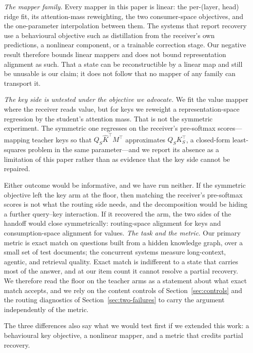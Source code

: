 \documentclass[11pt]{article}
\begin{document}
\emph{The mapper family.}
Every mapper in this paper is linear: the per-(layer, head) ridge fit, its
attention-mass reweighting, the two consumer-space objectives, and the
one-parameter interpolation between them.
The systems that report recovery use a behavioural objective such as distillation
from the receiver's own predictions, a nonlinear component, or a trainable
correction stage.
Our negative result therefore bounds linear mappers and does not bound
representation alignment as such.
That a state can be reconstructible by a linear map and still be unusable is our
claim; it does not follow that no mapper of any family can transport it.

\emph{The key side is untested under the objective we advocate.}
We fit the value mapper where the receiver reads value, but for keys we reweight a
representation-space regression by the student's attention mass.
That is not the symmetric experiment.
The symmetric one regresses on the receiver's pre-softmax scores---mapping teacher
keys so that $Q_S\hat K^{\top}M^{\top}$ approximates $Q_SK_S^{\top}$, a closed-form
least-squares problem in the same parameter---and we report its absence as a
limitation of this paper rather than as evidence that the key side cannot be
repaired.


Either outcome would be informative, and we have run neither. If the symmetric
objective left the key arm at the floor, then matching the receiver's pre-softmax
scores is not what the routing side needs, and the decomposition would be hiding
a further query--key interaction. If it recovered the arm, the two sides of the
handoff would close symmetrically: routing-space alignment for keys and
consumption-space alignment for values.
\emph{The task and the metric.}
Our primary metric is exact match on questions built from a hidden knowledge
graph, over a small set of test documents; the concurrent systems measure
long-context, agentic, and retrieval quality.
Exact match is indifferent to a state that carries most of the answer, and at our
item count it cannot resolve a partial recovery.
We therefore read the floor on the teacher arms as a statement about what exact
match accepts, and we rely on the content controls of Section~\ref{sec:controls}
and the routing diagnostics of Section~\ref{sec:two-failures} to carry the
argument independently of the metric.

The three differences also say what we would test first if we extended this work:
a behavioural key objective, a nonlinear mapper, and a metric that credits partial
recovery.
\end{document}
